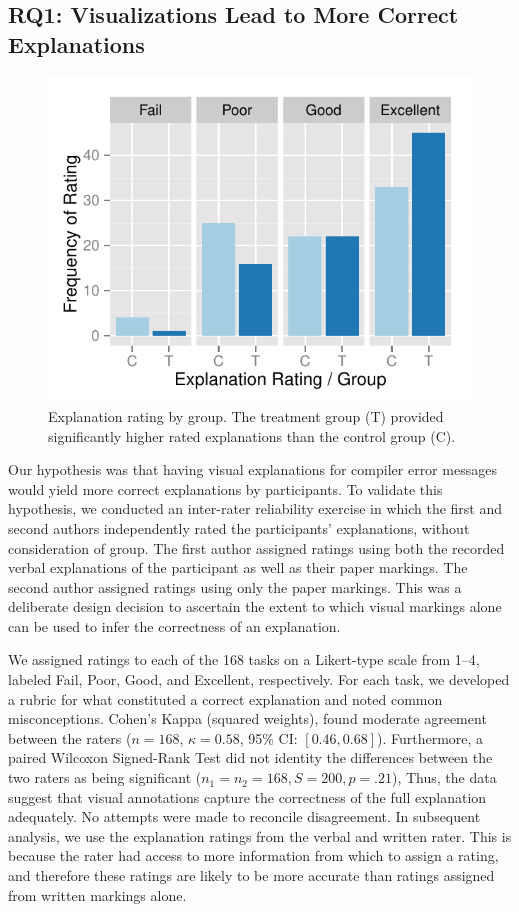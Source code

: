 \documentclass[conference]{IEEEtran}
\begin{document}
\subsection{RQ1: Visualizations Lead to More Correct Explanations}
\label{subsec:result:explanation}

\begin{figure}[!t]
\centering
\includegraphics[width=\linewidth]{ratingbygroup}
\caption{Explanation rating by group. The treatment group (T) provided significantly higher rated explanations than the control group (C).\label{fig:ratingbygroup}}
\end{figure}

Our hypothesis was that having visual explanations for compiler error messages would yield more correct explanations by participants. To validate this hypothesis, we conducted an inter-rater reliability exercise in which the first and second authors independently rated the participants' explanations, without consideration of group. The first author assigned ratings using both the recorded verbal explanations of the participant as well as their paper markings. The second author assigned ratings using only the paper markings. This was a deliberate design decision to ascertain the extent to which visual markings alone can be used to infer the correctness of an explanation.

We assigned ratings to each of the 168 tasks on a Likert-type scale from 1--4, labeled Fail, Poor, Good, and Excellent, respectively. For each task, we developed a rubric for what constituted a correct explanation and noted common misconceptions. Cohen's Kappa (squared weights), found moderate agreement between the raters ($n = 168$, $\kappa = 0.58$, 95\% CI: $[0.46,0.68]$). Furthermore, a paired Wilcoxon Signed-Rank Test did not identity the differences between the two raters as being significant ($n_1 = n_2 = 168, S = 200, p = .21$), Thus, the data suggest that visual annotations capture the correctness of the full explanation adequately. No attempts were made to reconcile disagreement. In subsequent analysis, we use the explanation ratings from the verbal and written rater. This is because the rater had access to more information from which to assign a rating, and therefore these ratings are likely to be more accurate than ratings assigned from written markings alone.
\end{document}
